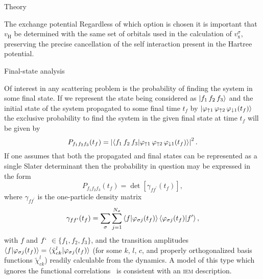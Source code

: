 \documentclass[aps, pra, reprint, groupedaddress, amsfonts, longbibliography,
               amsmath, amssymb, showpacs, nofootinbib]{revtex4-1}
\begin{document}
\begin{section}{Theory \label{sec:theory}}
\begin{subsection}{The exchange potential \label{sec:xpot}}
      Regardless of which option is chosen it is important that $v_\mathrm{H}$ be determined with the
      same set of orbitals used in the calculation of $v_\mathrm{x}^\sigma$, preserving the precise
      cancellation of the self interaction present in the Hartree potential.

   \end{subsection}

   \begin{subsection}{Final-state analysis \label{sec:probs}}

      Of interest in any scattering problem is the probability of finding the system in some final state.
      If we represent the state being considered as $\ket{f_1 \, f_2 \, f_3}$ and the initial state of
      the system propagated to some final time $t_f$ by $\ket{\varphi_{ \uparrow 1} \,
      \varphi_{\uparrow 2} \, \varphi_{\downarrow 1} (t_f)}$ the exclusive probability to find the
      system in the given final state at time $t_f$ will be given by
      \begin{equation} \label{eq:finalProb}
         P_{f_1 f_2 f_3}(t_f) = \left| \braket{ f_1 \, f_2 \, f_3 | \varphi_{ \uparrow 1} \,
                                       \varphi_{\uparrow 2} \, \varphi_{\downarrow 1} (t_f) } \right|^2.
      \end{equation}
      If one assumes that both the propagated and final states can be represented as a single Slater
      determinant then the probability in question may be expressed in the form
      \begin{equation} \label{eq:detProb}
         P_{f_1 f_2 f_3}(t_f) = \det \left[ \gamma_{f f^\prime}(t_f) \right],
      \end{equation}
      where $\gamma_{f f^\prime}$ is the one-particle density matrix
      \begin{equation} \label{eq:denmat}
         \gamma_{f f^\prime}(t_f) = \sum\limits_{\sigma} \sum\limits_{j = 1}^{N_\sigma}
                               \braket{f | \varphi_{\sigma j}(t_f)}
                               \braket{\varphi_{\sigma j}(t_f) | f^\prime},
      \end{equation}
      with $f$ and $f`$ $\in \{f_1, f_2, f_3\}$, and the transition amplitudes
      $\braket{f | \varphi_{\sigma j}(t_f)} = \braket{\tilde{\chi}^l_{c k} | \varphi_{\sigma j}(t_f)}$
      (for some $k$, $l$, $c$, and properly orthogonalized basis functions $\tilde{\chi}^l_{c k}$)
      readily calculable from the dynamics. A model of this type which ignores the functional
      correlations~\cite{p-he2p-he} is consistent with an \textsc{iem} description.


\end{subsection}
\end{section}
\end{document}

